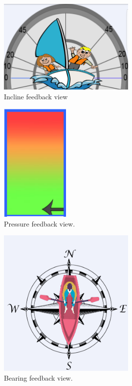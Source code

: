 \begin{figure}[H] 
	\centering
	\includegraphics[width=0.6\textwidth]{Figures/incline.png}
	\caption{Incline feedback view}
	\label{feedback-incline}
\end{figure}
\begin{figure}[H]
	\centering
	\includegraphics[width=0.3\textwidth]{Figures/pressure.png}
	\caption{Pressure feedback view.}
	\label{feedback-pressure}
\end{figure}
\begin{figure}[H]
	\centering
	\includegraphics[width=0.6\textwidth]{Figures/compass.png}
	\caption{Bearing feedback view.}
	\label{feedback-compass}
\end{figure}
